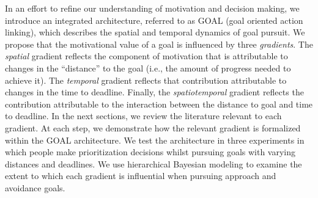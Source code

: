 \documentclass[a4paper,doc,natbib,donotrepeattitle]{apa6}
\begin{document}
In an effort to refine our understanding of motivation and decision making, we introduce an integrated architecture, referred to as GOAL (goal oriented action linking), which describes the spatial and temporal dynamics of goal pursuit. We propose that the motivational value of a goal is influenced by three \textit{gradients}. The \textit{spatial} gradient reflects the component of motivation that is attributable to changes in the ``distance'' to the goal (i.e., the amount of progress needed to achieve it). The \textit{temporal} gradient reflects that contribution attributable to changes in the time to deadline. Finally, the \textit{spatiotemporal} gradient reflects the contribution attributable to the interaction between the distance to goal and time to deadline. In the next sections, we review the literature relevant to each gradient. At each step, we demonstrate how the relevant gradient is formalized within the GOAL architecture. We test the architecture in three experiments in which people make prioritization decisions whilst pursuing goals with varying distances and deadlines. We use hierarchical Bayesian modeling to examine the extent to which each gradient is influential when pursuing approach and avoidance goals.


\end{document}
